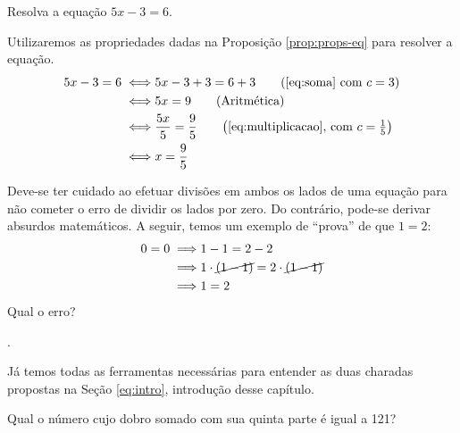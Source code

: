 \begin{example}
Resolva a equação $5x-3=6$.
\end{example}

\begin{solution}
Utilizaremos as propriedades dadas na Proposição \ref{prop:props-eq} para resolver a equação.
%
\begin{align*}
5x-3=6 \iff & 5x -3+3=6+3 \tag*{$\left(\text{\ref{eq:soma} com }c = 3\right) $}\\
		 \iff & 5x =9 \tag*{(Aritmética)}\\ 
		 \iff & \frac{5x}{5} =\frac 9 5 \tag*{$\left(\text{\ref{eq:multiplicacao}, com } c = \frac 1 5 \right) $}\\
		 \iff & x =\frac 9 5 
\end{align*}
\end{solution}



\begin{remark}
Deve-se ter  cuidado ao efetuar divisões em ambos os lados de uma equação para não cometer o erro de dividir os lados por zero. Do contrário, pode-se derivar absurdos matemáticos. A seguir, temos um exemplo de ``prova'' de que $1=2$:
%
\begin{align*}
0=0 \implies & 1-1=2-2 \\
	\implies & 1\cdot\cancel{(1-1)}=2\cdot\cancel{(1-1)} \\
	\implies & 1=2 
\end{align*}
%
Qual o erro?
\end{remark}

\begin{onlineact}
	.
\end{onlineact}


Já temos todas as ferramentas necessárias para entender as duas charadas propostas na Seção \ref{eq:intro}, introdução desse capítulo.

\begin{example}
Qual o número cujo dobro somado com sua quinta parte é igual a 121? 
\end{example}

